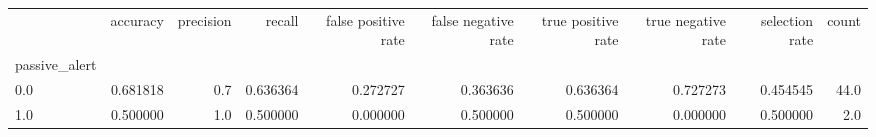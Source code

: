 \begin{tabular}{lrrrrrrrrr}
\toprule
{} &  accuracy &  precision &    recall &  false positive rate &  false negative rate &  true positive rate &  true negative rate &  selection rate &  count \\
passive\_alert &           &            &           &                      &                      &                     &                     &                 &        \\
\midrule
0.0           &  0.681818 &        0.7 &  0.636364 &             0.272727 &             0.363636 &            0.636364 &            0.727273 &        0.454545 &   44.0 \\
1.0           &  0.500000 &        1.0 &  0.500000 &             0.000000 &             0.500000 &            0.500000 &            0.000000 &        0.500000 &    2.0 \\
\bottomrule
\end{tabular}
